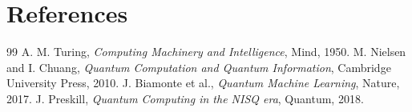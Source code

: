 \documentclass[11pt,a4paper]{article}
\begin{document}
\newpage

\section*{References}

\begin{thebibliography}{99}
 A. M. Turing, \textit{Computing Machinery and Intelligence}, Mind, 1950.
 M. Nielsen and I. Chuang, \textit{Quantum Computation and Quantum Information}, Cambridge University Press, 2010.
 J. Biamonte et al., \textit{Quantum Machine Learning}, Nature, 2017.
 J. Preskill, \textit{Quantum Computing in the NISQ era}, Quantum, 2018.
\end{thebibliography}
\end{document}
